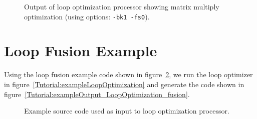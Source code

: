 \begin{figure}[!h]
{\indent
{\mySmallFontSize


\begin{latexonly}
   
\end{latexonly}

\begin{htmlonly}
   
\end{htmlonly}

}
}
\caption{Output of loop optimization processor showing matrix multiply
         optimization (using options: {\tt -bk1 -fs0}).}
\label{Tutorial:exampleOutput_LoopOptimization}
\end{figure}


\section{Loop Fusion Example}

   Using the loop fusion example code shown in 
figure~\ref{Tutorial:exampleInputCode_LoopOptimization_fusion}, we run the loop optimizer in
figure~\ref{Tutorial:exampleLoopOptimization} and generate the code shown in 
figure~\ref{Tutorial:exampleOutput_LoopOptimization_fusion}.

\begin{figure}[!h]
{\indent
{\mySmallFontSize


\begin{latexonly}
   
\end{latexonly}

\begin{htmlonly}
   
\end{htmlonly}

}
}
\caption{Example source code used as input to loop optimization processor.}
\label{Tutorial:exampleInputCode_LoopOptimization_fusion}
\end{figure}


